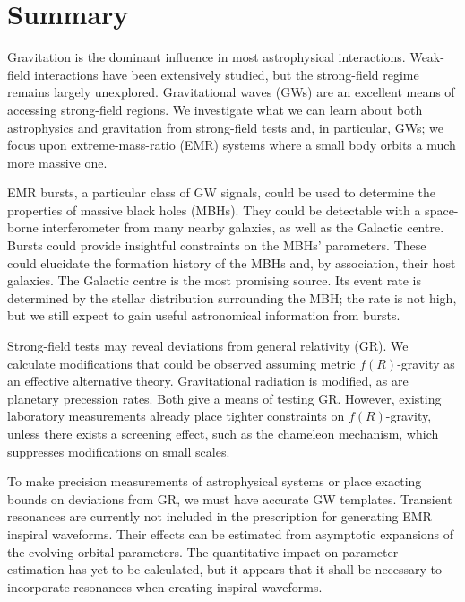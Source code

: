 \chapter{Summary}
\label{summary}

Gravitation is the dominant influence in most astrophysical interactions. Weak-field interactions have been extensively studied, but the strong-field regime remains largely unexplored. Gravitational waves (GWs) are an excellent means of accessing strong-field regions. We investigate what we can learn about both astrophysics and gravitation from strong-field tests and, in particular, GWs; we focus upon extreme-mass-ratio (EMR) systems where a small body orbits a much more massive one.

EMR bursts, a particular class of GW signals, could be used to determine the properties of massive black holes (MBHs). They could be detectable with a space-borne interferometer from many nearby galaxies, as well as the Galactic centre. Bursts could provide insightful constraints on the MBHs' parameters. These could elucidate the formation history of the MBHs and, by association, their host galaxies. The Galactic centre is the most promising source. Its event rate is determined by the stellar distribution surrounding the MBH; the rate is not high, but we still expect to gain useful astronomical information from bursts.

Strong-field tests may reveal deviations from general relativity (GR). We calculate modifications that could be observed assuming metric $f(R)$-gravity as an effective alternative theory. Gravitational radiation is modified, as are planetary precession rates. Both give a means of testing GR. However, existing laboratory measurements already place tighter constraints on $f(R)$-gravity, unless there exists a screening effect, such as the chameleon mechanism, which suppresses modifications on small scales.

To make precision measurements of astrophysical systems or place exacting bounds on deviations from GR, we must have accurate GW templates. Transient resonances are currently not included in the prescription for generating EMR inspiral waveforms. Their effects can be estimated from asymptotic expansions of the evolving orbital parameters. The quantitative impact on parameter estimation has yet to be calculated, but it appears that it shall be necessary to incorporate resonances when creating inspiral waveforms.
